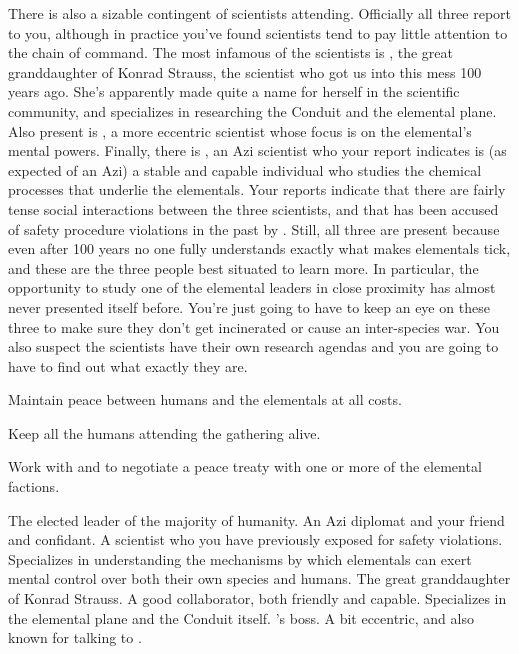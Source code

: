 \documentclass[char]{elementals}
\begin{document}
There is also a sizable contingent of scientists attending. Officially all three report to you, although in practice you've found scientists tend to pay little attention to the chain of command. The most infamous of the scientists is \cGD{\intro}, the great granddaughter of Konrad Strauss, the scientist who got us into this mess 100 years ago. She's apparently made quite a name for herself in the scientific community, and specializes in researching the Conduit and the elemental plane. Also present is \cMS{\intro}, a more eccentric scientist whose focus is on the elemental's mental powers. Finally, there is \cScientist{\intro}, an Azi scientist who your report indicates is (as expected of an Azi) a stable and capable individual who studies the chemical processes that underlie the elementals. Your reports indicate that there are fairly tense social interactions between the three scientists, and that \cMS{} has been accused of safety procedure violations in the past by \cScientist{}. Still, all three are present because even after 100 years no one fully understands exactly what makes elementals tick, and these are the three people best situated to learn more. In particular, the opportunity to study one of the elemental leaders in close proximity has almost never presented itself before. You're just going to have to keep an eye on these three to make sure they don't get incinerated or cause an inter-species war. You also suspect the scientists have their own research agendas and you are going to have to find out what exactly they are.


\begin{itemz}[Goals]
  \item Maintain peace between humans and the elementals at all costs.
  \item Keep all the humans attending the gathering alive.
  \item Work with \cAvatar{} and \cDiplomat{} to negotiate a peace treaty with one or more of the elemental factions.
  
\end{itemz}

\begin{contacts}
  \contact{\cLeader{}} The elected leader of the majority of humanity.
	\contact{\cDiplomat{}} An Azi diplomat and your friend and confidant.
	\contact{\cMS{}} A scientist who you have previously exposed for safety violations. Specializes in understanding the mechanisms by which elementals can exert mental control over both their own species and humans.
	\contact{\cGD{}} The great granddaughter of Konrad Strauss. A good collaborator, both friendly and capable. Specializes in the elemental plane and the Conduit itself.
  \contact{\cAvatar{}} \cDiplomat{}'s boss. A bit eccentric, and also known for talking to \cAvatar{\themself}.
\end{contacts}
\end{document}
